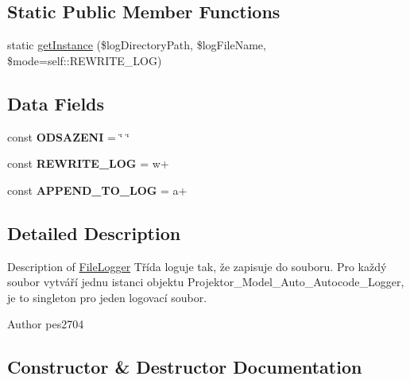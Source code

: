 \subsection*{Static Public Member Functions}
\begin{DoxyCompactItemize}
\item 
static \mbox{\hyperlink{class_pes_1_1_logger_1_1_file_logger_a601307f5beafcd15acf6fd66caeb373a}{get\+Instance}} (\$log\+Directory\+Path, \$log\+File\+Name, \$mode=self\+::\+R\+E\+W\+R\+I\+T\+E\+\_\+\+L\+OG)
\end{DoxyCompactItemize}
\subsection*{Data Fields}
\begin{DoxyCompactItemize}
\item 
\mbox{\label{class_pes_1_1_logger_1_1_file_logger_a4cc0bf0de9d2cb44f59125463000d07e}} 
const {\bfseries O\+D\+S\+A\+Z\+E\+NI} = \char`\"{} \char`\"{}
\item 
\mbox{\label{class_pes_1_1_logger_1_1_file_logger_a9bbdaa07fb1cf9339554f90594532912}} 
const {\bfseries R\+E\+W\+R\+I\+T\+E\+\_\+\+L\+OG} = \textquotesingle{}w+\textquotesingle{}
\item 
\mbox{\label{class_pes_1_1_logger_1_1_file_logger_a7122354c96472b1a74c9a438862a4c8c}} 
const {\bfseries A\+P\+P\+E\+N\+D\+\_\+\+T\+O\+\_\+\+L\+OG} = \textquotesingle{}a+\textquotesingle{}
\end{DoxyCompactItemize}


\subsection{Detailed Description}
Description of \mbox{\hyperlink{class_pes_1_1_logger_1_1_file_logger}{File\+Logger}} Třída loguje tak, že zapisuje do souboru. Pro každý soubor vytváří jednu istanci objektu Projektor\+\_\+\+Model\+\_\+\+Auto\+\_\+\+Autocode\+\_\+\+Logger, je to singleton pro jeden logovací soubor.

\begin{DoxyAuthor}{Author}
pes2704 
\end{DoxyAuthor}


\subsection{Constructor \& Destructor Documentation}
\mbox{\label{class_pes_1_1_logger_1_1_file_logger_a421831a265621325e1fdd19aace0c758}} 
